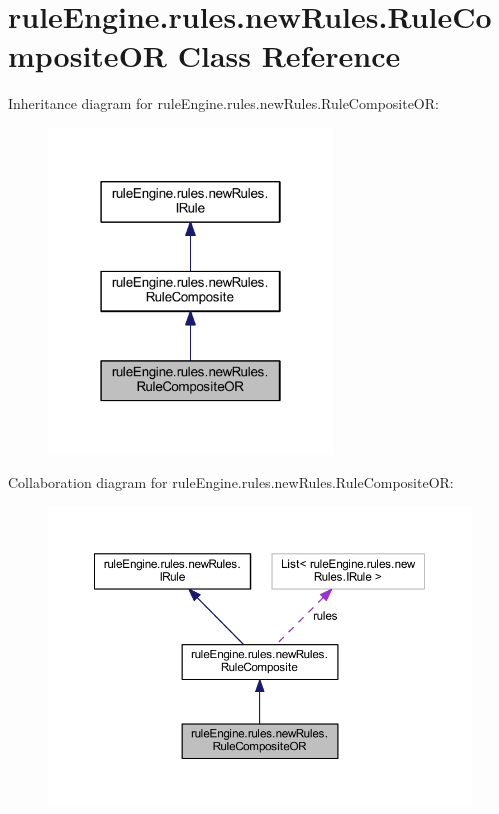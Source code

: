 \hypertarget{classrule_engine_1_1rules_1_1new_rules_1_1_rule_composite_o_r}{}\section{rule\+Engine.\+rules.\+new\+Rules.\+Rule\+Composite\+OR Class Reference}
\label{classrule_engine_1_1rules_1_1new_rules_1_1_rule_composite_o_r}


Inheritance diagram for rule\+Engine.\+rules.\+new\+Rules.\+Rule\+Composite\+OR\+:
\nopagebreak
\begin{figure}[H]
\begin{center}
\leavevmode
\includegraphics[width=214pt]{classrule_engine_1_1rules_1_1new_rules_1_1_rule_composite_o_r__inherit__graph}
\end{center}
\end{figure}


Collaboration diagram for rule\+Engine.\+rules.\+new\+Rules.\+Rule\+Composite\+OR\+:
\nopagebreak
\begin{figure}[H]
\begin{center}
\leavevmode
\includegraphics[width=350pt]{classrule_engine_1_1rules_1_1new_rules_1_1_rule_composite_o_r__coll__graph}
\end{center}
\end{figure}
